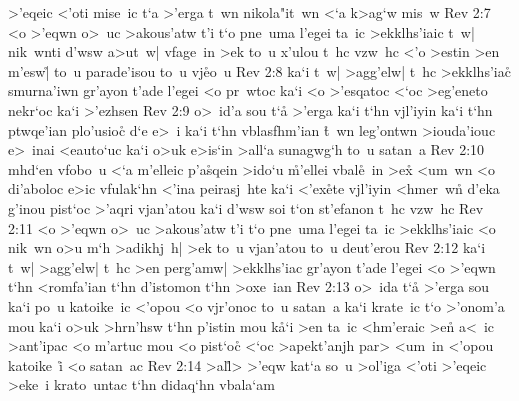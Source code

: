 >'eqeic
<'oti
mise~ic
t`a
>'erga
t~wn
nikola"it~wn
<`a
k>ag`w
mis~w\bibvsend
\vs Rev 2:7
<o
>'eqwn
o>~uc
>akous'atw
t'i
t`o
pne~uma
l'egei
ta~ic
>ekklhs'iaic
t~w|
nik~wnti
d'wsw
a>ut~w|
vfage~in
>ek
to~u
x'ulou
t~hc
vzw~hc
<'o
>estin
>en
m'esw|\r{}
to~u
parade'isou
to~u
vj\r{e}o~u\bibvsend
{}
\vs Rev 2:8
ka`i
t~w|
>agg'elw|
t~hc
>ekklhs'iac\r{}
smurna'iwn
gr'ayon
t'ade
l'egei
<o
pr~wtoc
ka`i
<o
>'esqatoc
<`oc
>eg'eneto
nekr`oc
ka`i
>'ezhsen\bibvsend
\vs Rev 2:9
o>~id'a
sou
t`a\r{}
>'erga
ka`i
t`hn
vjl'iyin
ka`i
t`hn
ptwqe'ian
plo'usioc\r{}
d`e
e>~i
ka`i
t`hn
vblasfhm'ian
\r{t}~wn
leg'ontwn
>iouda'iouc
e>~inai
<eauto`uc
ka`i
o>uk
e>is`in
>all`a
sunagwg`h
to~u
satan~a\bibvsend
\vs Rev 2:10
mhd`en
vfobo~u
<`a
m'elleic
p'a\r{s}qein
>ido`u
\r{m}'ellei
vbal\r{e}~in
>ex\r{}
<um~wn
<o
di'aboloc
e>ic
vfulak`hn
<'ina
peirasj~hte
ka`i
<'ex\r{e}te
vjl'iyin
<hmer~w\r{n}
d'eka
g'inou
pist`oc
>'aqri
vjan'atou
ka`i
d'wsw
soi
t`on
st'efanon
t~hc
vzw~hc\bibvsend
\vs Rev 2:11
<o
>'eqwn
o>~uc
>akous'atw
t'i
t`o
pne~uma
l'egei
ta~ic
>ekklhs'iaic
<o
nik~wn
o>u
m`h
>adikhj~h|
>ek
to~u
vjan'atou
to~u
deut'erou\bibvsend
\vs Rev 2:12
ka`i
t~w|
>agg'elw|
t~hc
>en
perg'amw|
>ekklhs'iac
gr'ayon
t'ade
l'egei
<o
>'eqwn
t`hn
<romfa'ian
t`hn
d'istomon
t`hn
>oxe~ian\bibvsend
\vs Rev 2:13
o>~ida
t`a\r{}
>'erga
sou
ka`i
po~u
katoike~ic
<'opou
<o
vjr'onoc
to~u
satan~a
ka`i
krate~ic
t`o
>'onom'a
mou
ka`i
o>uk
>hrn'hsw
t`hn
p'istin
mou
k\r{a}`i
>en
ta~ic
<hm'eraic
>en\r{}
a<~ic
>ant'ipac
<o
m'artuc
mou
<o
pist`o\r{c}
<`oc
>apekt'anjh
par>
<um~in
<'opou
katoike~i\r{}
<o
satan~ac\bibvsend
\vs Rev 2:14
>al\r{l}>
>'eqw
kat`a
so~u
>ol'iga
<'oti
>'eqeic
>eke~i
krato~untac
t`hn
didaq`hn
vbala`am
